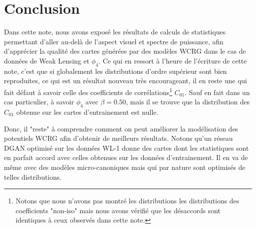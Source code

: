 \documentclass[12pt,twoside]{article}
\begin{document}
\section{Conclusion}
% 
Dans cette note, nous avons exposé les résultats de calculs de statistiques permettant d'aller au-delà de l'aspect visuel et spectre de puissance, afin d'apprécier la qualité des cartes générées par des modèles WCRG dans le cas de données de Weak Lensing et $\phi_4$. Ce qui en ressort à l'heure de l'écriture de cette note, c'est que si globalement les distributions d'ordre supérieur sont bien reproduites, ce qui est un résultat nouveau très encourageant, il en reste une qui fait défaut à savoir celle des coefficients de corrélations\footnote{Notons que nous n'avons pas montré les distributions les distributions des coefficients "non-iso" mais nous avons vérifié que  les désaccords sont identiques à ceux observés dans cette note.} $C_{01}$.  Sauf en fait dans un cas particulier, à savoir $\phi_4$ avec $\beta=0.50$, mais il se trouve que la distribution des $C_{01}$ obtenue sur les cartes d'entrainement est nulle.

Donc, il "reste" à comprendre comment on peut améliorer la modélisation des potentiels WCRG afin d'obtenir de meilleurs résultats. Notons qu'un réseau DGAN optimisé sur les données WL-1 donne des cartes dont les statistiques sont en parfait accord avec celles obtenues sur les données d'entrainement. Il en va de même avec des modèles micro-canoniques mais qui par nature sont optimisés de telles distributions.

\newpage


\end{document}
